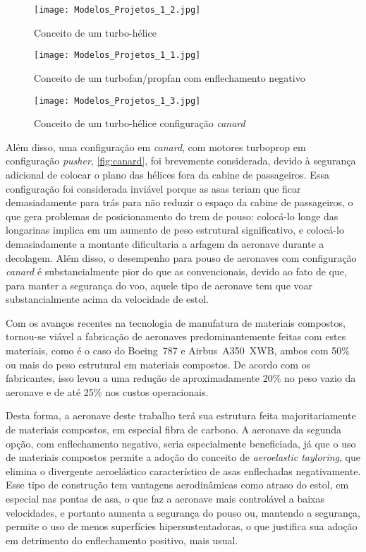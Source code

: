 \begin{figure}[H]
\centering
\texttt{[image: Modelos\_Projetos\_1\_2.jpg]}
\caption{Conceito de um turbo-hélice}
\label{fig:turbo-helice}
\end{figure}

\begin{figure}[H]
\centering
\texttt{[image: Modelos\_Projetos\_1\_1.jpg]}
\caption{Conceito de um turbofan/propfan com enflechamento negativo}
\label{fig:propfan}
\end{figure}

\begin{figure}[H]
\centering
\texttt{[image: Modelos\_Projetos\_1\_3.jpg]}
\caption{Conceito de um turbo-hélice configuração \emph{canard}}
\label{fig:canard}
\end{figure}

Além disso, uma configuração em \emph{canard}, com motores turboprop em configuração \emph{pusher}, \autoref{fig:canard}, foi brevemente considerada, devido à segurança adicional de colocar o plano das hélices fora da cabine de passageiros.
Essa configuração foi considerada inviável porque as asas teriam que ficar demasiadamente para trás para não reduzir o espaço da cabine de passageiros, o que gera problemas de posicionamento do trem de pouso: colocá-lo longe das longarinas implica em um aumento de peso estrutural significativo, e colocá-lo demasiadamente a montante dificultaria a arfagem da aeronave durante a decolagem.
Além disso, o desempenho para pouso de aeronaves com configuração \emph{canard} é substancialmente pior do que as convencionais, devido ao fato de que, para manter a segurança do voo, aquele tipo de aeronave tem que voar substancialmente acima da velocidade de estol.

Com os avanços recentes na tecnologia de manufatura de materiais compostos, tornou-se viável a fabricação de aeronaves predominantemente feitas com estes materiais, como é o caso do Boeing~787 e Airbus~A350~XWB, ambos com 50\% ou mais do peso estrutural em materiais compostos.
De acordo com os fabricantes, isso levou a uma redução de aproximadamente 20\% no peso vazio da aeronave e de até 25\% nos custos operacionais.\cite{boeing:787,airbus:a350xwb}

Desta forma, a aeronave deste trabalho terá sua estrutura feita majoritariamente de materiais compostos, em especial fibra de carbono.
A aeronave da segunda opção, com enflechamento negativo, seria especialmente beneficiada, já que o uso de materiais compostos permite a adoção do conceito de \emph{aeroelastic tayloring}, que elimina o divergente aeroelástico característico de asas enflechadas negativamente.
Esse tipo de construção tem vantagens aerodinâmicas como atraso do estol, em especial nas pontas de asa, o que faz a aeronave mais controlável a baixas velocidades, e portanto aumenta a segurança do pouso ou, mantendo a segurança, permite o uso de menos superfícies hipersustentadoras, o que justifica sua adoção em detrimento do enflechamento positivo, mais usual.\cite{weisshaar1980forward}

